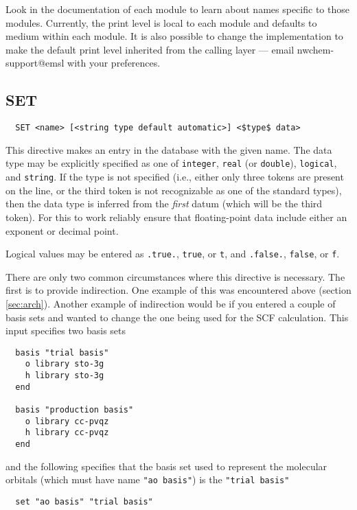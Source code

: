 Look in the documentation of each module to learn about names specific
to those modules.  Currently, the print level is local to each module
and defaults to medium within each module.  It is also possible to
change the implementation to make the default print level inherited
from the calling layer --- email nwchem-support@emsl with your
preferences.

\subsection{SET}
\label{sec:set}

\begin{verbatim}
  SET <name> [<string type default automatic>] <$type$ data>
\end{verbatim}

This directive makes an entry in the database with the given name.
The data type may be explicitly specified as one of \verb+integer+,
\verb+real+ (or \verb+double+), \verb+logical+, and \verb+string+.  If
the type is not specified (i.e., either only three tokens are present
on the line, or the third token is not recognizable as one of the
standard types), then the data type is inferred from the {\em first}
datum (which will be the third token).  For this to work reliably
ensure that floating-point data include either an exponent or decimal
point.

Logical values may be entered as \verb+.true.+, \verb+true+, or
\verb+t+, and \verb+.false.+, \verb+false+, or \verb+f+.

There are only two common circumstances where this directive is
necessary.  The first is to provide indirection.  One example of this
was encountered above (section \ref{sec:arch}).  Another example of
indirection would be if you entered a couple of basis sets and wanted
to change the one being used for the SCF calculation.  This input
specifies two basis sets
\begin{verbatim}
  basis "trial basis"
    o library sto-3g
    h library sto-3g
  end

  basis "production basis"
    o library cc-pvqz
    h library cc-pvqz
  end
\end{verbatim}
and the following specifies that the basis set used to represent the
molecular orbitals (which must have name \verb+"ao basis"+) is the
\verb+"trial basis"+
\begin{verbatim}
  set "ao basis" "trial basis"
\end{verbatim}

